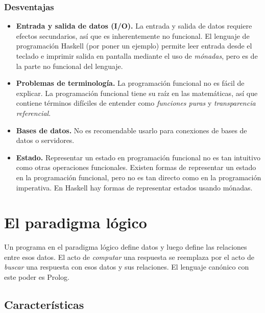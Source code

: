 \documentclass{article}
\begin{document}
\subsubsection*{Desventajas}

\begin{itemize}

\item \textbf{Entrada y salida de datos (I/O).} La entrada y salida de datos requiere efectos secundarios, así que es inherentemente no funcional. El lenguaje de programación Haskell (por poner un ejemplo) permite leer entrada desde el teclado e imprimir salida en pantalla mediante el uso de \textit{mónadas}, pero es de la parte no funcional del lenguaje.

\item \textbf{Problemas de terminología.} La programación funcional no es fácil de explicar. La programación funcional tiene su raíz en las matemáticas, así que contiene términos difíciles de entender como \textit{funciones puras} y \textit{transparencia referencial}.

\item \textbf{Bases de datos.} No es recomendable usarlo para conexiones de bases de datos o servidores.

\item \textbf{Estado.} Representar un estado en programación funcional no es tan intuitivo como otras operaciones funcionales. Existen formas de representar un estado en la programación funcional, pero no es tan directo como en la programación imperativa. En Haskell hay formas de representar estados usando mónadas.

\end{itemize}

\section{El paradigma lógico}

Un programa en el paradigma lógico define datos y luego define las relaciones entre esos datos. El acto de \textit{computar} una respuesta se reemplaza por el acto de \textit{buscar} una respuesta con esos datos y sus relaciones. El lenguaje canónico con este poder es Prolog.

\subsection{Características}
\end{document}
